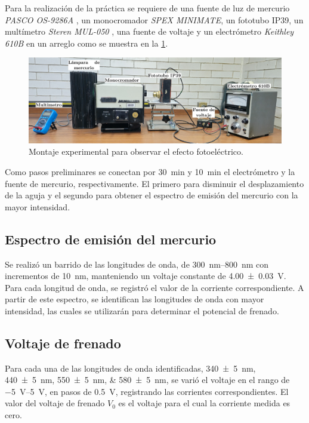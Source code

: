 \documentclass[12pt]{IEEEtran}
\begin{document}
Para la realización de la práctica se requiere de una fuente de luz de mercurio \emph{PASCO OS-9286A} \cite{InstructionSheetPASCO}, un monocromador \emph{SPEX MINIMATE}, un fototubo IP39, un multímetro \emph{Steren MUL-050} \cite{STERENMUL050MANUAL}, una fuente de voltaje y un electrómetro \emph{Keithley 610B} \cite{Keithley610B} en un arreglo como se muestra en la \cref{fig:photoelectric-arrangement}.

\begin{figure}[htp]
    \centering
    \includegraphics[width=\linewidth]{montaje-experimental}
    \caption{Montaje experimental para observar el efecto fotoeléctrico.}
    \label{fig:photoelectric-arrangement}
\end{figure}

Como pasos preliminares se conectan por \qty{30}{\minute} y \qty{10}{\minute} el electrómetro y la fuente de mercurio, respectivamente. El primero para disminuir el desplazamiento de la aguja y el segundo para obtener el espectro de emisión del mercurio con la mayor intensidad.


\subsection{Espectro de emisión del mercurio}

Se realizó un barrido de las longitudes de onda, de \qtyrange[range-phrase = --]{300}{800}{\nm} con incrementos de \qty{10}{\nm}, manteniendo un voltaje constante de \qty[separate-uncertainty-units = bracket]{4.00(3)}{\V}. Para cada longitud de onda, se registró el valor de la corriente correspondiente. A partir de este espectro, se identifican las longitudes de onda con mayor intensidad, las cuales se utilizarán para determinar el potencial de frenado.

\subsection{Voltaje de frenado}

Para cada una de las longitudes de onda identificadas, \qtylist[separate-uncertainty-units = bracket]{340(5);440(5);550(5);580(5)}{\nm}, se varió el voltaje en el rango de \qtyrange{-5}{5}{\V}, en pasos de \qty{0.5}{\V}, registrando las corrientes correspondientes. El valor del voltaje de frenado \(V_{0}\) es el voltaje para el cual la corriente medida es cero.
\end{document}
